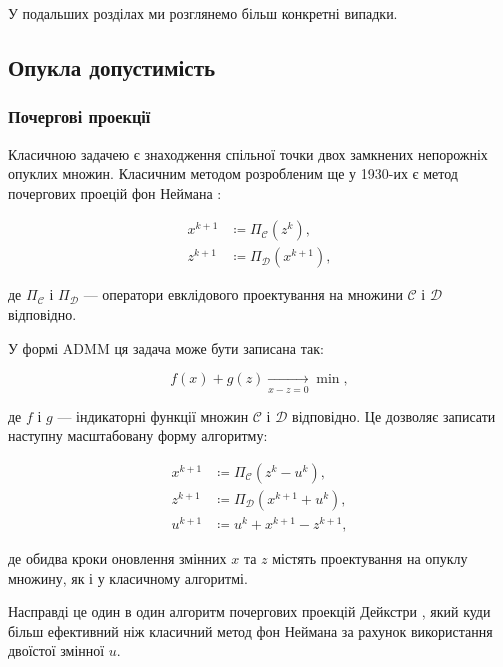 У подальших розділах ми розглянемо більш конкретні випадки.

\subsection{Опукла допустимість}

\subsubsection{Почергові проекції}

Класичною задачею є знаходження спільної точки двох замкнених непорожніх опуклих множин. Класичним методом розробленим ще у 1930-их є метод почергових проецій фон Неймана \cite{166, 36, 21}:

\begin{align}
	x^{k + 1} &\coloneqq \Pi_\mathcal{C} \left( z^k \right), \\
	z^{k + 1} &\coloneqq \Pi_\mathcal{D} \left( x^{k + 1} \right),
\end{align}

де $\Pi_\mathcal{C}$ і $\Pi_\mathcal{D}$ --- оператори евклідового проектування на множини $\mathcal{C}$ і $\mathcal{D}$ відповідно. \medskip

У формі ADMM ця задача може бути записана так:

\begin{equation}
	f(x) + g(z) \xrightarrow[x - z = 0]{} \min,
\end{equation}

де $f$ і $g$ --- індикаторні функції множин $\mathcal{C}$ і $\mathcal{D}$ відповідно. Це дозволяє записати наступну масштабовану форму алгоритму:

\begin{align}
	x^{k + 1} &\coloneqq \Pi_\mathcal{C} \left( z^k - u^k \right), \\
	z^{k + 1} &\coloneqq \Pi_\mathcal{D} \left( x^{k + 1} + u^k \right), \\
	u^{k + 1} &\coloneqq u^k + x^{k + 1} - z^{k + 1},
\end{align}

де обидва кроки оновлення змінних $x$ та $z$ містять проектування на опуклу множину, як і у класичному алгоритмі.

\begin{remark}
	Насправді це один в один алгоритм почергових проекцій Дейкстри \cite{56, 9}, який куди більш ефективний ніж класичний метод фон Неймана за рахунок використання двоїстої змінної $u$.
\end{remark}

